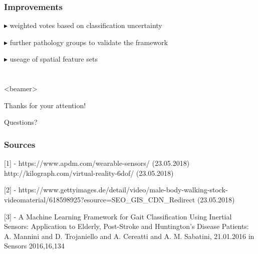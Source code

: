 \documentclass[aspectratio=43]{beamer} 	%
\begin{document}
\begin{frame}
\frametitle{Improvements}

\begin{block}
{$\blacktriangleright$ weighted votes based on classification uncertainty}
\end{block}

\begin{block}
{$\blacktriangleright$ further pathology groups to validate the framework}
\end{block}

\begin{block}
{$\blacktriangleright$ useage of spatial feature sets}
\end{block}

\end{frame}















\section*{}

\begin{frame}<beamer>{}
	\begin{center}
		Thanks for your attention!
	\end{center}
	\begin{center}
		Questions?
	\end{center}
\end{frame}











\begin{frame}
\frametitle {Sources}

{[1]	 - https://www.apdm.com/wearable-sensors/ (23.05.2018)  \newline http://kilograph.com/virtual-reality-6dof/ (23.05.2018)}



 {[2] - https://www.gettyimages.de/detail/video/male-body-walking-stock-videomaterial/618598925?esource=SEO\_GIS\_CDN\_Redirect (23.05.2018)}


{[3] - A Machine Learning Framework for Gait Classification Using Inertial Sensors: Application to Elderly, Post-Stroke and Huntington's Disease Patients: A. Mannini and D. Trojaniello and A. Cereatti and A. M. Sabatini, 21.01.2016 in Sensors 2016,16,134} 


\end{frame}
\end{document}
